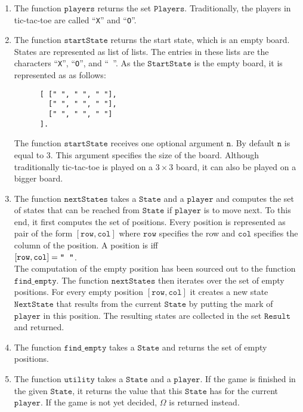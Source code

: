 \begin{enumerate}
\item The function $\texttt{players}$ returns the set $\texttt{Players}$.  Traditionally, the players in
      tic-tac-toe are called ``\texttt{X}'' and ``\texttt{O}''.
\item The function $\texttt{startState}$ returns the start state, which is an empty board.
      States are represented as list of lists.  The entries in these lists are the characters 
      ``\texttt{X}'', ``\texttt{O}'', and ``\texttt{ }''.
      As the  $\texttt{StartState}$ is the empty board, it is represented as as follows:
      \begin{Verbatim}
      [ [" ", " ", " "], 
        [" ", " ", " "], 
        [" ", " ", " "]
      ].     
      \end{Verbatim}
      The function $\texttt{startState}$ receives one optional argument $\texttt{n}$.
      By default $\texttt{n}$ is equal to $3$.  This argument specifies the size of the board.
      Although traditionally tic-tac-toe is played on a $3 \times 3$ board, it can also 
      be played on a bigger board.
\item The function $\texttt{nextStates}$ takes a $\texttt{State}$ and a $\texttt{player}$ and computes the set
      of states that can be reached from $\texttt{State}$ if $\texttt{player}$ is to move next.
      To this end, it first computes the set of  positions.  Every position is represented as pair of the
      form $[\texttt{row}, \texttt{col}]$ where $\texttt{row}$ specifies the row and $\texttt{col}$ specifies
      the column of the position.  A position is  iff
      \\[0.2cm]
      \hspace*{1.3cm}
      $[\texttt{row}, \texttt{col}] = \texttt{\symbol{34}\;\;\symbol{34}}$.
      \\[0.2cm]
      The computation of the empty position has been sourced out to the function $\texttt{find\_empty}$.
      The function $\texttt{nextStates}$ then iterates over the set of empty positions. For every 
      empty position $[\texttt{row}, \texttt{col}]$ it creates a new state $\texttt{NextState}$ that results
      from the current $\texttt{State}$ by putting the mark of $\texttt{player}$ in this position.  
      The resulting states are collected in the set $\texttt{Result}$ and returned.
\item The function $\texttt{find\_empty}$ takes a $\texttt{State}$ and returns the set of empty positions.
\item The function $\texttt{utility}$ takes a $\texttt{State}$ and a $\texttt{player}$.  If the game is 
      finished in the given $\texttt{State}$, it returns the value that this $\texttt{State}$ has for the
      current $\texttt{player}$.  If the game is not yet decided, $\Omega$ is returned instead.
 

\end{enumerate}
